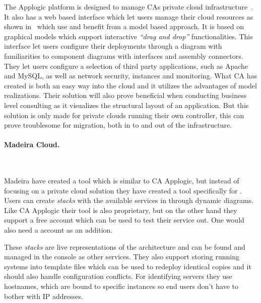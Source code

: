 The Applogic platform is designed to manage CAs private cloud 
infrastructure~\cite{introducing-cloud-services}.
It also has a web based interface which let users manage their cloud resources 
as shown in~ which use and benefit from a model based approach.
It is based on graphical models which support interactive \emph{``drag and drop''} functionalities.
This interface let users configure their deployments through a diagram with familiarities to 
 component diagrams with interfaces and assembly connectors. 
They let users configure a selection of third party applications, 
such as Apache and MySQL, as well as network security, instances and monitoring. 
What CA has created is both an easy way into the cloud and it utilizes 
the advantages of model realizations. 
Their solution will also prove beneficial when conducting business level consulting
as it visualizes the structural layout of an application.
But this solution is only made for private clouds running their own controller, 
this can prove troublesome for migration, both in to and out of the infrastructure.

\paragraph{Madeira Cloud.}~\cite{madeiracloud}



Madeira have created a tool which is similar to CA Applogic, but instead of focusing
on a private cloud solution they have created a tool specifically for  .
Users can create \emph{stacks} with the available services in  through 
dynamic diagrams.
Like CA Applogic their tool is also proprietary, but on the other hand they support
a free account which can be used to test their service out.
One would also need a  account as an addition.

These \emph{stacks} are live representations of the architecture and can be found 
and managed in the  console as other  services.
They also support storing running systems into template files which can be used
to redeploy identical copies and it should also handle configuration conflicts.
For identifying servers they use hostnames, which are bound to specific instances 
so end users don't have to bother with IP addresses.


